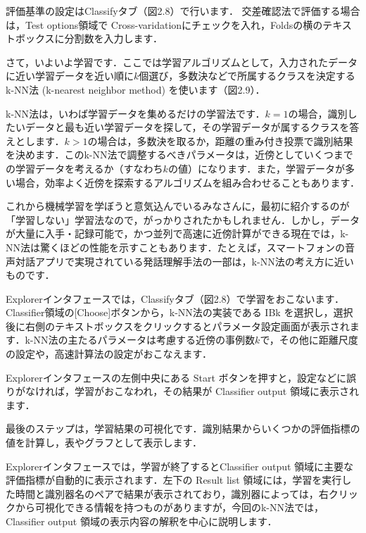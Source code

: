 評価基準の設定はClassifyタブ（図2.8）で行います．
交差確認法で評価する場合は，Test options領域で Cross-varidationにチェックを入れ，Foldsの横のテキストボックスに分割数を入力します．



さて，いよいよ学習です．ここでは学習アルゴリズムとして，入力されたデータに近い学習データを近い順に$k$個選び，多数決などで所属するクラスを決定する
k-NN法 (k-nearest neighbor method) 
を使います（図2.9）．


k-NN法は，いわば学習データを集めるだけの学習法です．$k=1$の場合，識別したいデータと最も近い学習データを探して，その学習データが属するクラスを答えとします．$k>1$の場合は，多数決を取るか，距離の重み付き投票で識別結果を決めます．このk-NN法で調整するべきパラメータは，近傍としていくつまでの学習データを考えるか（すなわち$k$の値）になります．また，学習データが多い場合，効率よく近傍を探索するアルゴリズムを組み合わせることもあります．

これから機械学習を学ぼうと意気込んでいるみなさんに，最初に紹介するのが「学習しない」学習法なので，がっかりされたかもしれません．しかし，データが大量に入手・記録可能で，かつ並列で高速に近傍計算ができる現在では，k-NN法は驚くほどの性能を示すこともあります．たとえば，スマートフォンの音声対話アプリで実現されている発話理解手法の一部は，k-NN法の考え方に近いものです．


Explorerインタフェースでは，Classifyタブ（図2.8）で学習をおこないます．Classifier領域の[Choose]ボタンから，k-NN法の実装である IBk を選択し，選択後に右側のテキストボックスをクリックするとパラメータ設定画面が表示されます．k-NN法の主たるパラメータは考慮する近傍の事例数$k$で，その他に距離尺度の設定や，高速計算法の設定がおこなえます．

Explorerインタフェースの左側中央にある Start ボタンを押すと，設定などに誤りがなければ，学習がおこなわれ，その結果が Classifier output 領域に表示されます．


最後のステップは，学習結果の可視化です．識別結果からいくつかの評価指標の値を計算し，表やグラフとして表示します．


Explorerインタフェースでは，学習が終了するとClassifier output 領域に主要な評価指標が自動的に表示されます．左下の Result list 領域には，学習を実行した時間と識別器名のペアで結果が表示されており，識別器によっては，右クリックから可視化できる情報を持つものがありますが，今回のk-NN法では， Classifier output 領域の表示内容の解釈を中心に説明します．

